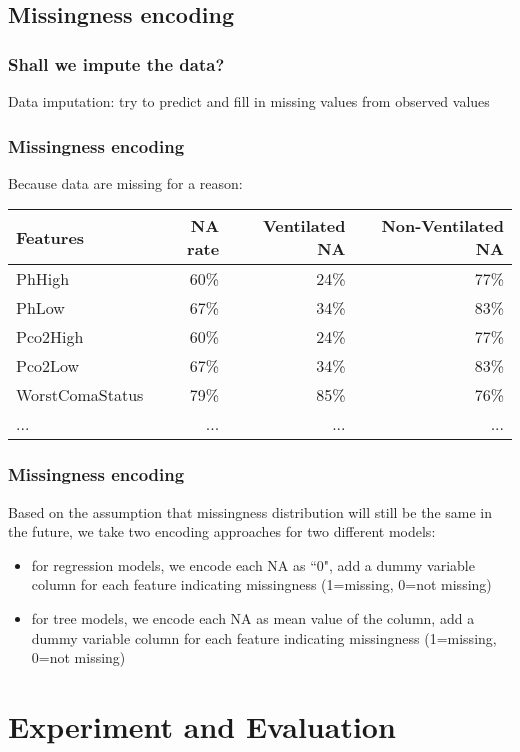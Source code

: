 \documentclass{beamer}
\begin{document}
\subsection{Missingness encoding}
\begin{frame}
\frametitle{Shall we impute the data?}
Data imputation: try to predict and fill in missing values from observed values
\end{frame}
\begin{frame}
\frametitle{Missingness encoding}
Because data are missing for a reason:
\begin{table}
\begin{tabular}{l r r r}
\toprule
\textbf{Features} & \textbf{NA rate} & \textbf{Ventilated NA} & \textbf{Non-Ventilated NA}\\
\midrule
PhHigh & 60\% & 24\% & 77\%\\
PhLow & 67\% & 34\% & 83\%\\
Pco2High & 60\% & 24\% & 77\%\\
Pco2Low & 67\% & 34\% & 83\%\\
WorstComaStatus & 79\% & 85\% & 76\%\\
... & ...&...&...\\
\bottomrule
\end{tabular}
\end{table}
\end{frame}
\begin{frame}
\frametitle{Missingness encoding}
Based on the assumption that missingness distribution will still be the same in the future, we take two encoding approaches for two different models: 
\begin{itemize}
\item for regression models, we encode each NA as ``0", add a dummy variable column for each feature indicating missingness 
\newline (1=missing, 0=not missing)
\item for tree models, we encode each NA as mean value of the column, add a dummy variable column for each feature indicating missingness (1=missing, 0=not missing)
\end{itemize}
\end{frame}
\section{Experiment and Evaluation}
\end{document}

